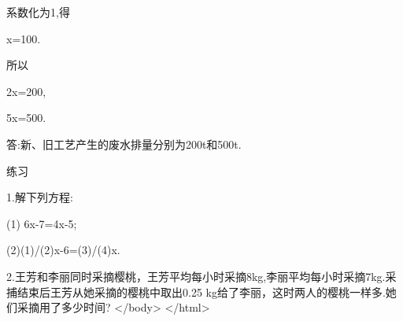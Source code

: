     系数化为1,得

    x=100.

    所以

    2x=200,

    5x=500.

    答:新、旧工艺产生的废水排量分别为200t和500t.
    \endexample
    \beginexercise

   练习

    1.解下列方程:

    (1) 6x-7=4x-5;

    (2)(1)/(2)x-6=(3)/(4)x.

    2.王芳和李丽同时采摘樱桃，王芳平均每小时采摘8kg,李丽平均每小时采摘7kg.采捕结束后王芳从她采摘的樱桃中取出0.25 kg给了李丽，这时两人的樱桃一样多.她们采摘用了多少时间?
    \endexercise
\endarticle
\enddocument
</body>
</html>
